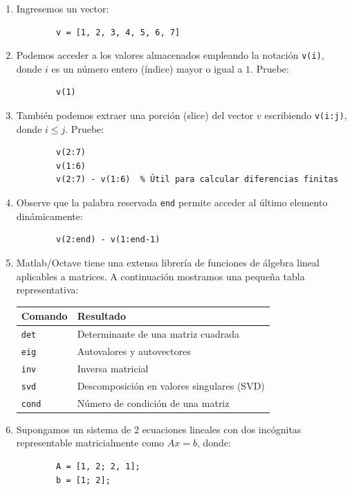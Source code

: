 \documentclass[11pt,a4paper,openany]{book}
\begin{document}
\begin{enumerate}
	
	\item Ingresemos un vector:
	\begin{verbatim}
		v = [1, 2, 3, 4, 5, 6, 7]
	\end{verbatim}
	
	\item Podemos acceder a los valores almacenados empleando la notación \verb-v(i)-, donde $i$ es un número entero (índice) mayor o igual a $1$. Pruebe:
	\begin{verbatim}
		v(1)
	\end{verbatim}
	
	\item También podemos extraer una porción (slice) del vector $v$ escribiendo \verb-v(i:j)-, donde $i \leq j$. Pruebe:
	\begin{verbatim}
		v(2:7)
		v(1:6)
		v(2:7) - v(1:6)  % Útil para calcular diferencias finitas
	\end{verbatim}
	
	\item Observe que la palabra reservada \texttt{end} permite acceder al último elemento dinámicamente:
	\begin{verbatim}
		v(2:end) - v(1:end-1)
	\end{verbatim}
	
	\item Matlab/Octave tiene una extensa librería de funciones de álgebra lineal aplicables a matrices. A continuación mostramos una pequeña tabla representativa:
	\begin{center}
		\begin{tabular}{ll}
			\textbf{Comando} & \textbf{Resultado} \\ \hline
			\texttt{det} & Determinante de una matriz cuadrada \\
			\texttt{eig} & Autovalores y autovectores \\
			\texttt{inv} & Inversa matricial \\
			\texttt{svd} & Descomposición en valores singulares (SVD) \\
			\texttt{cond} & Número de condición de una matriz \\
		\end{tabular}
	\end{center}
	
	\item Supongamos un sistema de 2 ecuaciones lineales con dos incógnitas representable matricialmente como $Ax=b$, donde:
	\begin{verbatim}
		A = [1, 2; 2, 1];
		b = [1; 2];
	\end{verbatim}
	

\end{enumerate}
\end{document}
